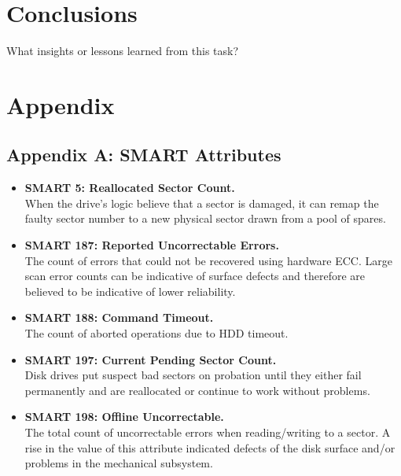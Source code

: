 \documentclass[12pt,a4paper,english]{amsart}
\begin{document}
\section{Conclusions}

What insights or lessons learned from this task?



\newpage

\section*{Appendix}


\subsection*{Appendix A: SMART Attributes}

\begin{appendix}
	\begin{itemize}
		\item \textbf{SMART 5: Reallocated Sector Count.} \\
		When the drive’s logic believe that a sector is damaged, it can remap the faulty sector number to a new physical sector drawn from a pool of spares.
		\item \textbf{SMART 187: Reported Uncorrectable Errors.} \\
		The count of errors that could not be recovered using hardware ECC. Large scan error counts can be indicative of surface defects and therefore are believed to be indicative of lower reliability.
		\item \textbf{SMART 188: Command Timeout.} \\
		The count of aborted operations due to HDD timeout.
		\item \textbf{SMART 197: Current Pending Sector Count.} \\
		Disk drives put suspect bad sectors on probation until they either fail permanently and are reallocated or continue to work without problems.
		\item \textbf{SMART 198: Offline Uncorrectable.} \\
		The total count of uncorrectable errors when reading/writing to a sector. A rise in the value of this attribute indicated defects of the disk surface and/or problems in the mechanical subsystem.
	\end{itemize}
\end{appendix}
\end{document}
